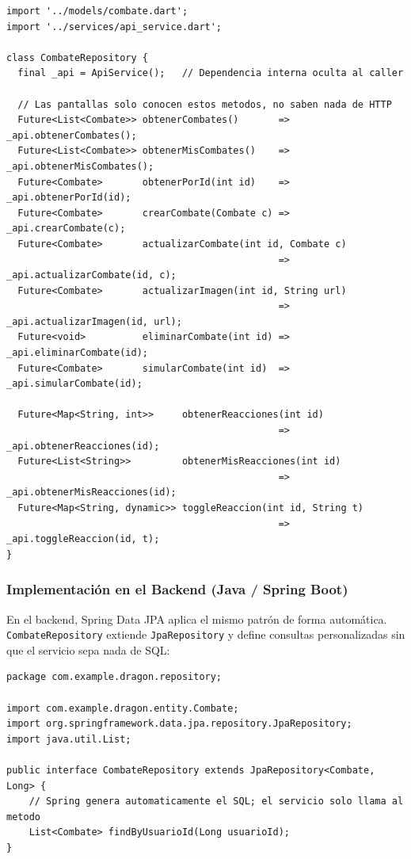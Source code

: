 \documentclass{article}
\begin{document}
\begin{lstlisting}[style=dartStyle, caption={CombateRepository -- capa de acceso a datos (lib/repositories/combate\_repository.dart)}]
import '../models/combate.dart';
import '../services/api_service.dart';
 
class CombateRepository {
  final _api = ApiService();   // Dependencia interna oculta al caller
 
  // Las pantallas solo conocen estos metodos, no saben nada de HTTP
  Future<List<Combate>> obtenerCombates()       => _api.obtenerCombates();
  Future<List<Combate>> obtenerMisCombates()    => _api.obtenerMisCombates();
  Future<Combate>       obtenerPorId(int id)    => _api.obtenerPorId(id);
  Future<Combate>       crearCombate(Combate c) => _api.crearCombate(c);
  Future<Combate>       actualizarCombate(int id, Combate c)
                                                => _api.actualizarCombate(id, c);
  Future<Combate>       actualizarImagen(int id, String url)
                                                => _api.actualizarImagen(id, url);
  Future<void>          eliminarCombate(int id) => _api.eliminarCombate(id);
  Future<Combate>       simularCombate(int id)  => _api.simularCombate(id);
 
  Future<Map<String, int>>     obtenerReacciones(int id)
                                                => _api.obtenerReacciones(id);
  Future<List<String>>         obtenerMisReacciones(int id)
                                                => _api.obtenerMisReacciones(id);
  Future<Map<String, dynamic>> toggleReaccion(int id, String t)
                                                => _api.toggleReaccion(id, t);
}
\end{lstlisting}
 
\subsubsection*{Implementaci\'on en el Backend (Java / Spring Boot)}
 
En el backend, Spring Data JPA aplica el mismo patr\'on de forma autom\'atica.
\texttt{CombateRepository} extiende \texttt{JpaRepository} y define consultas
personalizadas sin que el servicio sepa nada de SQL:
 
\begin{lstlisting}[style=javaStyle, caption={CombateRepository en Spring Data JPA (repository/CombateRepository.java)}]
package com.example.dragon.repository;
 
import com.example.dragon.entity.Combate;
import org.springframework.data.jpa.repository.JpaRepository;
import java.util.List;
 
public interface CombateRepository extends JpaRepository<Combate, Long> {
    // Spring genera automaticamente el SQL; el servicio solo llama al metodo
    List<Combate> findByUsuarioId(Long usuarioId);
}
\end{lstlisting}
 
\end{document}
